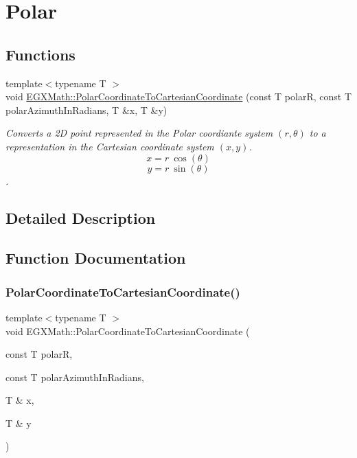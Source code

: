 \hypertarget{group___e_g_x_math-_conversions-_coordinate_conversions-2_d-_polar}{}\section{Polar}
\label{group___e_g_x_math-_conversions-_coordinate_conversions-2_d-_polar}
\subsection*{Functions}
\begin{DoxyCompactItemize}
\item 
{\footnotesize template$<$typename T $>$ }\\void \mbox{\hyperlink{group___e_g_x_math-_conversions-_coordinate_conversions-2_d-_polar_ga842125a118ed7788a5ceeaf796687bf6}{E\+G\+X\+Math\+::\+Polar\+Coordinate\+To\+Cartesian\+Coordinate}} (const T polarR, const T polar\+Azimuth\+In\+Radians, T \&x, T \&y)
\begin{DoxyCompactList}\small\item\em Converts a 2D point represented in the Polar coordiante system $(r,\theta)$ to a representation in the Cartesian coordinate system $(x,y)$. \[ x = r\ \cos(\theta) \] \[ y = r\ \sin(\theta) \]. \end{DoxyCompactList}\end{DoxyCompactItemize}


\subsection{Detailed Description}


\subsection{Function Documentation}
\mbox{\label{group___e_g_x_math-_conversions-_coordinate_conversions-2_d-_polar_ga842125a118ed7788a5ceeaf796687bf6}} 
\subsubsection{\texorpdfstring{Polar\+Coordinate\+To\+Cartesian\+Coordinate()}{PolarCoordinateToCartesianCoordinate()}}
{\footnotesize\ttfamily template$<$typename T $>$ \\
void E\+G\+X\+Math\+::\+Polar\+Coordinate\+To\+Cartesian\+Coordinate (\begin{DoxyParamCaption}\item[{const T}]{polarR,  }\item[{const T}]{polar\+Azimuth\+In\+Radians,  }\item[{T \&}]{x,  }\item[{T \&}]{y }\end{DoxyParamCaption})}



